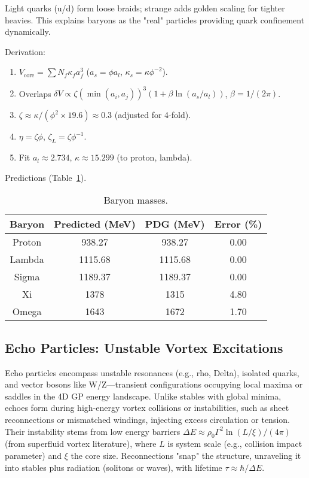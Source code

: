 \documentclass{article}
\begin{document}
Light quarks (u/d) form loose braids; strange adds golden scaling for tighter heavies. This explains baryons as the "real" particles providing quark confinement dynamically.

Derivation:
\begin{enumerate}
\item $V_{\text{core}} = \sum N_f \kappa_f a_f^3$ ($a_s = \phi a_l$, $\kappa_s = \kappa \phi^{-2}$).
\item Overlaps $\delta V \propto \zeta (\min(a_i,a_j))^3 (1 + \beta \ln(a_s/a_l))$, $\beta=1/(2\pi)$.
\item $\zeta \approx \kappa / (\phi^2 \times 19.6) \approx 0.3$ (adjusted for 4-fold).
\item $\eta = \zeta \phi$, $\zeta_L = \zeta \phi^{-1}$.
\item Fit $a_l \approx 2.734$, $\kappa \approx 15.299$ (to proton, lambda).
\end{enumerate}

Predictions (Table~\ref{tab:baryons}).

\begin{table}[h!]
\centering
\begin{tabular}{|c|c|c|c|}
\hline
Baryon & Predicted (MeV) & PDG (MeV) & Error (\%) \\
\hline
Proton & 938.27 & 938.27 & 0.00 \\
Lambda & 1115.68 & 1115.68 & 0.00 \\
Sigma & 1189.37 & 1189.37 & 0.00 \\
Xi & 1378 & 1315 & 4.80 \\
Omega & 1643 & 1672 & 1.70 \\
\hline
\end{tabular}
\caption{Baryon masses.}
\label{tab:baryons}
\end{table}

\subsection{Echo Particles: Unstable Vortex Excitations}

Echo particles encompass unstable resonances (e.g., rho, Delta), isolated quarks, and vector bosons like W/Z—transient configurations occupying local maxima or saddles in the 4D GP energy landscape. Unlike stables with global minima, echoes form during high-energy vortex collisions or instabilities, such as sheet reconnections or mismatched windings, injecting excess circulation or tension. Their instability stems from low energy barriers $\Delta E \approx \rho_0 \Gamma^2 \ln(L / \xi) / (4\pi)$ (from superfluid vortex literature), where $L$ is system scale (e.g., collision impact parameter) and $\xi$ the core size. Reconnections "snap" the structure, unraveling it into stables plus radiation (solitons or waves), with lifetime $\tau \approx \hbar / \Delta E$.
\end{document}
